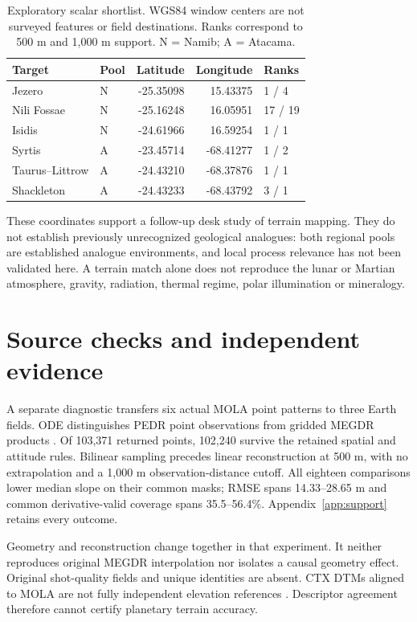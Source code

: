\begin{table}[htbp]
\centering\small
\caption{Exploratory scalar shortlist. WGS84 window centers are not surveyed features or field destinations. Ranks correspond to 500 m and 1,000 m support. N = Namib; A = Atacama.}
\label{tab:shortlist}
\begin{tabular}{llrrl}
\toprule
Target & Pool & Latitude & Longitude & Ranks\\
\midrule
Jezero & N & -25.35098 & 15.43375 & 1 / 4\\
Nili Fossae & N & -25.16248 & 16.05951 & 17 / 19\\
Isidis & N & -24.61966 & 16.59254 & 1 / 1\\
Syrtis & A & -23.45714 & -68.41277 & 1 / 2\\
Taurus--Littrow & A & -24.43210 & -68.37876 & 1 / 1\\
Shackleton & A & -24.43233 & -68.43792 & 3 / 1\\
\bottomrule
\end{tabular}
\end{table}

These coordinates support a follow-up desk study of terrain mapping. They do not establish previously unrecognized geological analogues: both regional pools are established analogue environments, and local process relevance has not been validated here. A terrain match alone does not reproduce the lunar or Martian atmosphere, gravity, radiation, thermal regime, polar illumination or mineralogy.

\section{Source checks and independent evidence}
A separate diagnostic transfers six actual MOLA point patterns to three Earth fields. ODE distinguishes PEDR point observations from gridded MEGDR products \cite{ode}. Of 103,371 returned points, 102,240 survive the retained spatial and attitude rules. Bilinear sampling precedes linear reconstruction at 500 m, with no extrapolation and a 1,000 m observation-distance cutoff. All eighteen comparisons lower median slope on their common masks; RMSE spans 14.33--28.65 m and common derivative-valid coverage spans 35.5--56.4\%. Appendix~\ref{app:support} retains every outcome.

Geometry and reconstruction change together in that experiment. It neither reproduces original MEGDR interpolation nor isolates a causal geometry effect. Original shot-quality fields and unique identities are absent. CTX DTMs aligned to MOLA are not fully independent elevation references \cite{ctx}. Descriptor agreement therefore cannot certify planetary terrain accuracy.

